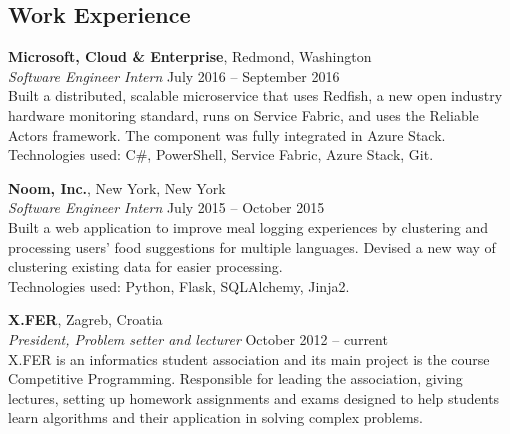 \documentclass[margin,line]{resume}
\begin{document}
\begin{resume}
\vspace{1mm}
\section{\mysidestyle Work Experience}

\textbf{Microsoft, Cloud \& Enterprise}, Redmond, Washington \vspace{1mm}\\\vspace{1mm}%
\textsl{Software Engineer Intern} \hfill July 2016 -- September 2016\\%
Built a distributed, scalable microservice that uses Redfish, a new open industry hardware monitoring standard, runs on Service Fabric, and uses the Reliable Actors framework. The component was fully integrated in Azure Stack. \\
Technologies used: C\#, PowerShell, Service Fabric, Azure Stack, Git.

\textbf{Noom, Inc.}, New York, New York \vspace{1mm}\\\vspace{1mm}%
\textsl{Software Engineer Intern} \hfill July 2015 -- October 2015\\%
Built a web application to improve meal logging experiences by clustering and processing users' food suggestions for multiple languages. Devised a new way of clustering existing data for easier processing. \\
Technologies used: Python, Flask, SQLAlchemy, Jinja2.

\textbf{X.FER}, Zagreb, Croatia \vspace{1mm}\\\vspace{1mm}%
\textsl{President, Problem setter and lecturer} \hfill October 2012 -- current\\%
X.FER is an informatics student association and its main project is the course Competitive Programming. Responsible for leading the association, giving lectures, setting up homework assignments and exams designed to help students learn algorithms and their application in solving complex problems.



\end{resume}
\end{document}
